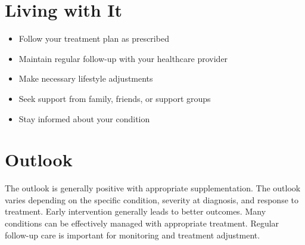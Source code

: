 \section{Living with It}
\begin{itemize}[noitemsep]
  \item Follow your treatment plan as prescribed
  \item Maintain regular follow-up with your healthcare provider
  \item Make necessary lifestyle adjustments
  \item Seek support from family, friends, or support groups
  \item Stay informed about your condition
\end{itemize}
\section{Outlook}
The outlook is generally positive with appropriate supplementation. The outlook varies depending on the specific condition, severity at diagnosis, and response to treatment. Early intervention generally leads to better outcomes. Many conditions can be effectively managed with appropriate treatment. Regular follow-up care is important for monitoring and treatment adjustment.
